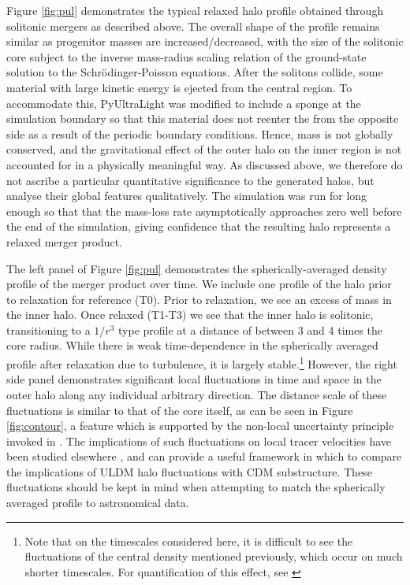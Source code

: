 \documentclass[a4paper,11pt]{article}
\begin{document}
Figure \ref{fig:pul} demonstrates the typical relaxed halo profile obtained through solitonic mergers as described above. The overall shape of the profile remains similar as progenitor masses are increased/decreased, with the size of the solitonic core subject to the inverse mass-radius scaling relation of the ground-state solution to the Schr{\"o}dinger-Poisson equations. After the solitons collide, some material with large kinetic energy is ejected from the central region. To accommodate this, {\sc PyUltraLight} was modified to include a sponge at the simulation boundary so that this material does not reenter the from the opposite side as a result of the periodic boundary conditions. Hence, mass is not globally conserved, and the gravitational effect of the outer halo on the inner region is not accounted for in a physically meaningful way. As discussed above, we therefore do not ascribe a particular quantitative significance to the generated halos, but analyse their global features qualitatively. The simulation was run for long enough so that that the mass-loss rate asymptotically approaches zero well before the end of the simulation, giving confidence that the resulting halo represents a relaxed merger product. 

The left panel of Figure \ref{fig:pul} demonstrates the spherically-averaged density profile of the merger product over time. We include one profile of the halo prior to relaxation for reference (T0). Prior to relaxation, we see an excess of mass in the inner halo. Once relaxed (T1-T3) we see that the inner halo is solitonic, transitioning to a $1/r^3$ type profile at a distance of between 3 and 4 times the core radius. While there is weak time-dependence in the spherically averaged profile after relaxation due to turbulence, it is largely stable.\footnote{Note that on the timescales considered here, it is difficult to see the fluctuations of the central density mentioned previously, which occur on much shorter timescales. For quantification of this effect, see \cite{Veltmaat:2018dfz}} However, the right side panel demonstrates significant local fluctuations in time and space in the outer halo along any individual arbitrary direction. The distance scale of these fluctuations is similar to that of the core itself, as can be seen in Figure \ref{fig:contour}, a feature which is supported by the non-local uncertainty principle invoked in \cite{Schive:2014hza}. The implications of such fluctuations on local tracer velocities have been studied elsewhere \cite{Marsh:2018zyw}, and can provide a useful framework in which to compare the implications of ULDM halo fluctuations with CDM substructure. These fluctuations should be kept in mind when attempting to match the spherically averaged profile to astronomical data.
\end{document}
